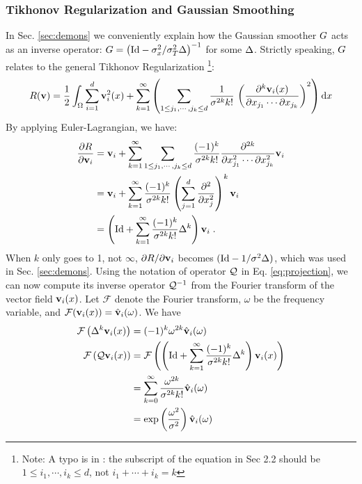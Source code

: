 \documentclass[letterpaper,12pt]{article}
\begin{document}
\subsubsection*{Tikhonov Regularization and Gaussian Smoothing}
\label{sec:gaussian}
In Sec. \ref{sec:demons} we conveniently explain how the Gaussian
smoother ${G}$ acts as an inverse operator: ${G} = \left( \text{Id} -
  {\sigma_x^2}/{\sigma_T^2} \Delta \right)^{-1}$ for some $\Delta$. Strictly speaking, ${G}$ relates to the general Tikhonov Regularization \cite{Nielsen1997,Mansi2010}\footnote{Note: A typo is in \cite{Mansi2010}: the subscript of the equation in Sec 2.2 should be $1 \leq i_1, \cdots, i_k \leq d$, not $i_1 + \cdots + i_k=k$}:
\begin{align}
R(\mathbf{v}) = \frac{1}{2} \int_\Omega \sum_{i=1}^d
\mathbf{v}_i^2(x) + 
\sum_{k=1}^{\infty}
\left(
\sum_{1 \leq j_1, \cdots, j_k \leq d}
\frac{1}{\sigma^{2k} k!} \,
\left(
\frac{\partial^k \mathbf{v}_i(x)}{\partial x_{j_1} \cdots \partial x_{j_k}}
\right)^2
\right)
\text{d} x
\end{align}
By applying Euler-Lagrangian, we have:
\begin{equation}
\begin{split}
\frac{\partial R}{\partial \mathbf{v}_i} & = \mathbf{v}_i 
+ \sum_{k=1}^{\infty} 
\sum_{1 \leq j_1, \cdots, j_k \leq d}
\frac{(-1)^k}{\sigma^{2k}k!}
\frac{\partial^{2k}}{\partial x^2_{j_1} \cdots \partial x^2_{j_k}} \mathbf{v}_i \\
& =
\mathbf{v}_i 
+ \sum_{k=1}^{\infty} 
\frac{(-1)^k}{\sigma^{2k}k!}
\left(
\sum_{j=1}^{d}
\frac{\partial^{2}}{\partial x^2_{j}}  
\right)^k \mathbf{v}_i
\\
& = 
\left(
\text{Id} + \sum_{k=1}^{\infty} 
\frac{(-1)^k}{\sigma^{2k}k!}
\Delta^k
\right) \mathbf{v}_i \;.
\end{split}
\end{equation}
When $k$ only goes to 1, not $\infty$, $\partial R / \partial \mathbf{v}_i$ becomes $(\text{Id} - 1/\sigma^2 \Delta)$, which was used in Sec. \ref{sec:demons}. Using the notation of operator $\mathcal{Q}$ in Eq. \ref{eq:projection}, we can now compute its inverse operator $\mathcal{Q}^{-1}$ from the Fourier transform of the vector field $\mathbf{v}_i(x)$. Let $\mathcal{F}$ denote the Fourier transform, $\omega$ be the frequency variable, and $\mathcal{F}(\mathbf{v}_i(x)) = \hat{\mathbf{v}}_i(\omega)$. We have
\begin{equation}
\begin{split}
\mathcal{F}\left(
\Delta^k \mathbf{v}_i(x)
\right)
 & = (-1)^k \omega^{2k} \hat{\mathbf{v}}_i(\omega) 
\\
\mathcal{F}\left( \mathcal{Q} \mathbf{v}_i(x) \right) 
& = \mathcal{F}\left(
\left(
\text{Id} + \sum_{k=1}^{\infty} 
\frac{(-1)^k}{\sigma^{2k}k!}
\Delta^k
\right)
\mathbf{v}_i(x)
\right)
\\
& = 
\sum_{k=0}^{\infty} 
\frac{\omega^{2k}}{\sigma^{2k} k!} \hat{\mathbf{v}}_i(\omega)\\
& =
\exp \left(
\frac{\omega^2}{\sigma^2}
\right) \hat{\mathbf{v}}_i(\omega)
\end{split}
\end{equation}
\end{document}
